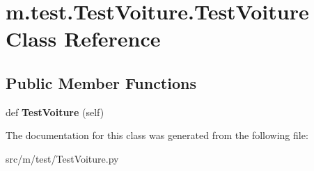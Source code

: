 \hypertarget{classm_1_1test_1_1_test_voiture_1_1_test_voiture}{}\section{m.\+test.\+Test\+Voiture.\+Test\+Voiture Class Reference}
\label{classm_1_1test_1_1_test_voiture_1_1_test_voiture}
\subsection*{Public Member Functions}
\begin{DoxyCompactItemize}
\item 
\hypertarget{classm_1_1test_1_1_test_voiture_1_1_test_voiture_ad1941dea71f30320d3b0f8aa337d559c}{}def {\bfseries Test\+Voiture} (self)\label{classm_1_1test_1_1_test_voiture_1_1_test_voiture_ad1941dea71f30320d3b0f8aa337d559c}

\end{DoxyCompactItemize}


The documentation for this class was generated from the following file\+:\begin{DoxyCompactItemize}
\item 
src/m/test/Test\+Voiture.\+py\end{DoxyCompactItemize}
